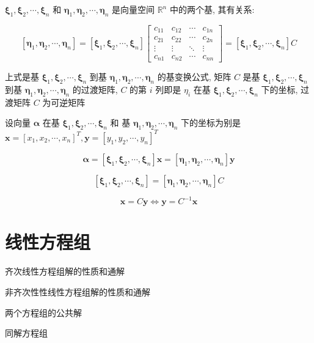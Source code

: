 \begin{definition}[基变换]
	$\boldsymbol{\xi}_{1},\boldsymbol{\xi}_{2},\cdots,\boldsymbol{\xi}_{n}$ 和 $\boldsymbol{\eta}_{1},\boldsymbol{\eta}_{2},\cdots,\boldsymbol{\eta}_{n}$ 是向量空间 $\mathbb{R}^{n}$ 中的两个基, 其有关系:  
	
	$$[\boldsymbol{\eta}_{1},\boldsymbol{\eta}_{2},\cdots,\boldsymbol{\eta}_{n}] = 
	[\boldsymbol{\xi}_{1},\boldsymbol{\xi}_{2},\cdots,\boldsymbol{\xi}_{n}]
	\begin{bmatrix}
		c_{11} & c_{12} & \cdots & c_{1n}\\
		c_{21} & c_{22} & \cdots & c_{2n}\\
		\vdots & \vdots & \ddots & \vdots\\
		c_{n1} & c_{n2} & \cdots & c_{nn}
	\end{bmatrix} = [\boldsymbol{\xi}_{1},\boldsymbol{\xi}_{2},\cdots,\boldsymbol{\xi}_{n}]C$$
	
	上式是基 $\boldsymbol{\xi}_{1},\boldsymbol{\xi}_{2},\cdots,\boldsymbol{\xi}_{n}$ 到基 $\boldsymbol{\eta}_{1},\boldsymbol{\eta}_{2},\cdots,\boldsymbol{\eta}_{n}$ 的基变换公式,
	矩阵 $C$ 是基 $\boldsymbol{\xi}_{1},\boldsymbol{\xi}_{2},\cdots,\boldsymbol{\xi}_{n}$ 到基 $\boldsymbol{\eta}_{1},\boldsymbol{\eta}_{2},\cdots,\boldsymbol{\eta}_{n}$ 的过渡矩阵,
	$C$ 的第 $i$ 列即是 $\eta_{i}$ 在基 $\boldsymbol{\xi}_{1},\boldsymbol{\xi}_{2},\cdots,\boldsymbol{\xi}_{n}$ 下的坐标, 过渡矩阵 $C$ 为可逆矩阵
\end{definition}
\begin{definition}[坐标变换]
	设向量 $\boldsymbol{\alpha}$ 在基 $\boldsymbol{\xi}_{1},\boldsymbol{\xi}_{2},\cdots,\boldsymbol{\xi}_{n}$ 和
	基 $\boldsymbol{\eta}_{1},\boldsymbol{\eta}_{2},\cdots,\boldsymbol{\eta}_{n}$ 下的坐标为别是 $\mathbf{x}=[x_{1},x_{2},\cdots,x_{n}]^{T},\mathbf{y}=[y_{1},y_{2},\cdots,y_{n}]^{T}$

	$$\boldsymbol{\alpha}=[\boldsymbol{\xi}_{1},\boldsymbol{\xi}_{2},\cdots,\boldsymbol{\xi}_{n}]\mathbf{x} = [\boldsymbol{\eta}_{1},\boldsymbol{\eta}_{2},\cdots,\boldsymbol{\eta}_{n}]\mathbf{y}$$

	$$[\boldsymbol{\xi}_{1},\boldsymbol{\xi}_{2},\cdots,\boldsymbol{\xi}_{n}] = [\boldsymbol{\eta}_{1},\boldsymbol{\eta}_{2},\cdots,\boldsymbol{\eta}_{n}]C$$
	
	$$\mathbf{x} = C\mathbf{y} \Leftrightarrow \mathbf{y} = C^{-1}\mathbf{x}$$
\end{definition}



\chapter{线性方程组}
\begin{introduction}
	\item 齐次线性方程组解的性质和通解
	\item 非齐次性性线性方程组解的性质和通解
	\item 两个方程组的公共解
	\item 同解方程组
\end{introduction}
